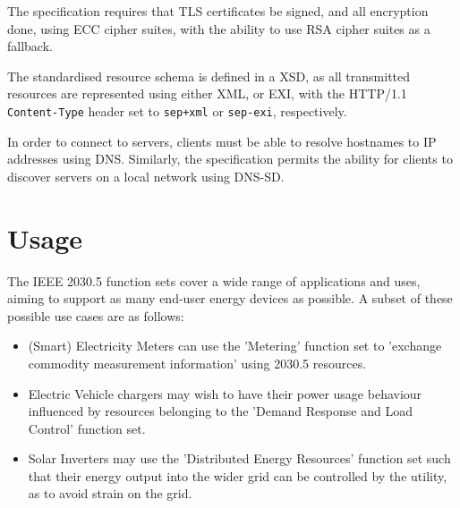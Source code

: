 The specification requires that TLS certificates be signed, and all encryption done, using ECC cipher suites, with the ability to use RSA cipher suites as a fallback.

The standardised resource schema is defined in a XSD, as all transmitted resources are represented using either XML, or EXI, with the HTTP/1.1 \texttt{Content-Type} header set to \texttt{sep+xml} or \texttt{sep-exi}, respectively.

In order to connect to servers, clients must be able to resolve hostnames to IP addresses using DNS. Similarly, the specification permits the ability for clients to discover servers on a local network using DNS-SD.

\section{Usage}
The IEEE 2030.5 function sets cover a wide range of applications and uses, aiming to support as many end-user energy devices as possible. A subset of these possible use cases are as follows:
\begin{itemize}
    \item (Smart) Electricity Meters can use the 'Metering' function set to 'exchange commodity measurement information' using 2030.5 resources. \cite{IEEE2030.5}
    \item Electric Vehicle chargers may wish to have their power usage behaviour influenced by resources belonging to the 'Demand Response and Load Control' function set.
    \item Solar Inverters may use the 'Distributed Energy Resources' function set such that their energy output into the wider grid can be controlled by the utility, as to avoid strain on the grid.
\end{itemize}
